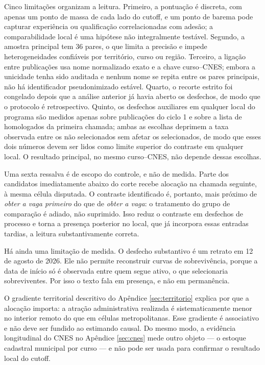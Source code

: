 \documentclass[11pt,a4paper]{article}
\begin{document}
Cinco limitações organizam a leitura. Primeiro, a pontuação é discreta, com
apenas um ponto de massa de cada lado do cutoff, e um ponto de barema pode
capturar experiência ou qualificação correlacionadas com adesão; a
comparabilidade local é uma hipótese não integralmente testável. Segundo, a
amostra principal tem 36 pares, o que limita a precisão e impede
heterogeneidades confiáveis por território, curso ou região. Terceiro, a ligação
entre publicações usa nome normalizado exato e a chave curso--CNES; embora a
unicidade tenha sido auditada e nenhum nome se repita entre os pares principais,
não há identificador pseudonimizado estável. Quarto, o recorte estrito foi
congelado depois que a análise anterior já havia aberto os desfechos, de modo que
o protocolo é retrospectivo. Quinto, os desfechos auxiliares em qualquer local do
programa são medidos apenas sobre publicações do ciclo 1 e sobre a lista de
homologados da primeira chamada; ambas as escolhas deprimem a taxa observada
entre os não selecionados sem afetar os selecionados, de modo que esses dois
números devem ser lidos como limite superior do contraste em qualquer local. O
resultado principal, no mesmo curso--CNES, não depende dessas escolhas.

Uma sexta ressalva é de escopo do controle, e não de medida. Parte dos candidatos
imediatamente abaixo do corte recebe alocação na chamada seguinte, à mesma célula
disputada. O contraste identificado é, portanto, mais próximo de \emph{obter a
vaga primeiro} do que de \emph{obter a vaga}: o tratamento do grupo de comparação
é adiado, não suprimido. Isso reduz o contraste em desfechos de processo e torna a
presença posterior no local, que já incorpora essas entradas tardias, a leitura
substantivamente correta.

Há ainda uma limitação de medida. O desfecho substantivo é um retrato em 12 de
agosto de 2026. Ele não permite reconstruir curvas de sobrevivência, porque a
data de início só é observada entre quem segue ativo, o que selecionaria
sobreviventes. Por isso o texto fala em presença, e não em permanência.

O gradiente territorial descritivo do Apêndice \ref{sec:territorio} explica por
que a alocação importa: a atração administrativa realizada é sistematicamente
menor no interior remoto do que em células metropolitanas. Esse gradiente é
associativo e não deve ser fundido ao estimando causal. Do mesmo modo, a
evidência longitudinal do CNES no Apêndice \ref{sec:cnes} mede outro objeto
--- o estoque cadastral municipal por curso --- e não pode ser usada para
confirmar o resultado local do cutoff.
\end{document}
